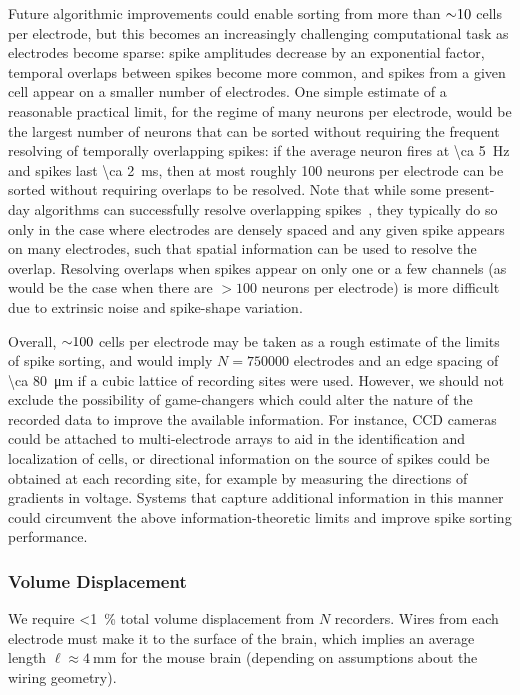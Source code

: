 Future algorithmic improvements could enable sorting from more than ${\sim}\num{10}$ cells per electrode, but this becomes an increasingly challenging computational task as electrodes become sparse: spike amplitudes decrease by an exponential factor, temporal overlaps between spikes become more common, and spikes from a given cell appear on a smaller number of electrodes.  One simple estimate of a reasonable practical limit, for the regime of many neurons per electrode, would be the largest number of neurons that can be sorted without requiring the frequent resolving of temporally overlapping spikes: if the average neuron fires at \SI{\ca 5}{\hertz} and spikes last \SI{\ca 2}{\milli\second}, then at most roughly \num{100} neurons per electrode can be sorted without requiring overlaps to be resolved.  Note that while some present-day algorithms can successfully resolve overlapping spikes~\cite{marre12,pillow13,segev04,ge2011,prentice2011}, they typically do so only in the case where electrodes are densely spaced and any given spike appears on many electrodes, such that spatial information can be used to resolve the overlap. Resolving overlaps when spikes appear on only one or a few channels (as would be the case when there are $>\num{100}$ neurons per electrode) is more difficult due to extrinsic noise and spike-shape variation.

Overall,  ${\sim}\num{100}$ cells per electrode may be taken as a rough estimate of the limits of spike sorting, and would imply $N = \num{750000}$ electrodes and an edge spacing of \SI{\ca 80}{\micro\meter} if a cubic lattice of recording sites were used.  However, we should not exclude the possibility of game-changers which could alter the nature of the recorded data to improve the available information. For instance, CCD cameras could be attached to multi-electrode arrays to aid in the identification and localization of cells, or directional information on the source of spikes could be obtained at each recording site, for example by measuring the directions of gradients in voltage. Systems that capture additional information in this manner could circumvent the above information-theoretic limits and improve spike sorting performance.

\subsubsection{Volume Displacement}

We require \SI{<1}{\percent} total volume displacement from $N$ recorders.
Wires from each electrode must make it to the surface of the brain, which implies an average length $\ell\approx\SI{4}{\milli\meter}$ for the mouse brain (depending on assumptions about the wiring geometry).

